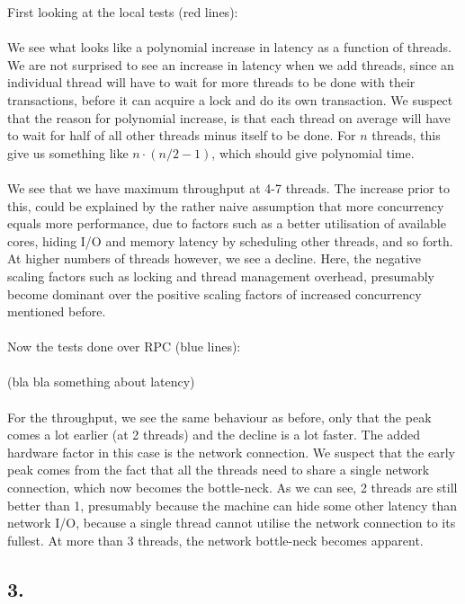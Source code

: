 \documentclass[12pt]{article}
\begin{document}
First looking at the local tests (red lines):
\\
\\
We see what looks like a polynomial increase in latency as a function of threads. We are not surprised to see an increase in latency when we add threads, since an individual thread will have to wait for more threads to be done with their transactions, before it can acquire a lock and do its own transaction. We suspect that the reason for polynomial increase, is that each thread on average will have to wait for half of all other threads minus itself to be done. For $n$ threads, this give us something like $n\cdot(n/2-1)$, which should give polynomial time.
\\
\\
We see that we have maximum throughput at 4-7 threads. The increase prior to this, could be explained by the rather naive assumption that more concurrency equals more performance, due to factors such as a better utilisation of available cores, hiding I/O and memory latency by scheduling other threads, and so forth. At higher numbers of threads however, we see a decline. Here, the negative scaling factors such as locking and thread management overhead, presumably become dominant over the positive scaling factors of increased concurrency mentioned before.
\\
\\
Now the tests done over RPC (blue lines):
\\
\\
(bla bla something about latency)
\\
\\
For the throughput, we see the same behaviour as before, only that the peak comes a lot earlier (at 2 threads) and the decline is a lot faster. The added hardware factor in this case is the network connection. We suspect that the early peak comes from the fact that all the threads need to share a single network connection, which now becomes the bottle-neck. As we can see, 2 threads are still better than 1, presumably because the machine can hide some other latency than network I/O, because a single thread cannot utilise the network connection to its fullest. At more than 3 threads, the network bottle-neck becomes apparent.

\subsection*{3.}
\end{document}
